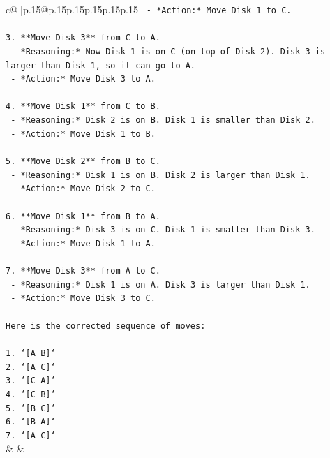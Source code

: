 \documentclass{article}
\begin{document}
{\begin{supertabular}{c@{$\;$}|p{.15\linewidth}@{}p{.15\linewidth}p{.15\linewidth}p{.15\linewidth}p{.15\linewidth}p{.15\linewidth}}
{{{\texttt{    {-} *Action:* Move Disk 1 to C.} \\
\\ 
\texttt{3.  **Move Disk 3** from C to A.} \\
\texttt{    {-} *Reasoning:* Now Disk 1 is on C (on top of Disk 2). Disk 3 is larger than Disk 1, so it can go to A.} \\
\texttt{    {-} *Action:* Move Disk 3 to A.} \\
\\ 
\texttt{4.  **Move Disk 1** from C to B.} \\
\texttt{    {-} *Reasoning:* Disk 2 is on B. Disk 1 is smaller than Disk 2.} \\
\texttt{    {-} *Action:* Move Disk 1 to B.} \\
\\ 
\texttt{5.  **Move Disk 2** from B to C.} \\
\texttt{    {-} *Reasoning:* Disk 1 is on B. Disk 2 is larger than Disk 1.} \\
\texttt{    {-} *Action:* Move Disk 2 to C.} \\
\\ 
\texttt{6.  **Move Disk 1** from B to A.} \\
\texttt{    {-} *Reasoning:* Disk 3 is on C. Disk 1 is smaller than Disk 3.} \\
\texttt{    {-} *Action:* Move Disk 1 to A.} \\
\\ 
\texttt{7.  **Move Disk 3** from A to C.} \\
\texttt{    {-} *Reasoning:* Disk 1 is on A. Disk 3 is larger than Disk 1.} \\
\texttt{    {-} *Action:* Move Disk 3 to C.} \\
\\ 
\texttt{Here is the corrected sequence of moves:} \\
\\ 
\texttt{1.  `{[}A B{]}`} \\
\texttt{2.  `{[}A C{]}`} \\
\texttt{3.  `{[}C A{]}`} \\
\texttt{4.  `{[}C B{]}`} \\
\texttt{5.  `{[}B C{]}`} \\
\texttt{6.  `{[}B A{]}`} \\
\texttt{7.  `{[}A C{]}`} \\
            }
        }
    }
    & & \\ \\


\end{supertabular}}
\end{document}
